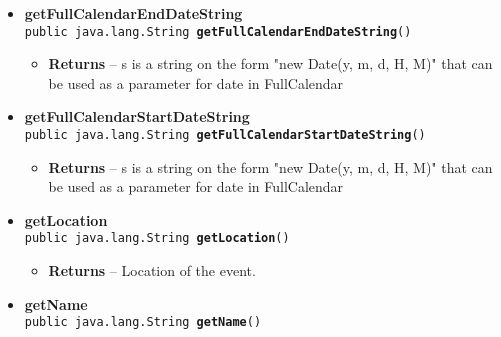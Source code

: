\documentclass[11pt,a4paper]{report}
\begin{document}
{{{\begin{itemize}
{
\hypertarget{is.mpg.ruglan.CalEvent.getEnd()}{{\bf  getEnd}\\}
\texttt{public java.util.Date\ {\bf  getEnd}()
\label{is.mpg.ruglan.CalEvent.getEnd()}}%
\begin{itemize}
\item{{\bf  Returns} -- 
End date of the event. 
}%
\end{itemize}
}%
\item{ 
\hypertarget{is.mpg.ruglan.CalEvent.getFullCalendarEndDateString()}{{\bf  getFullCalendarEndDateString}\\}
\texttt{public java.lang.String\ {\bf  getFullCalendarEndDateString}()
\label{is.mpg.ruglan.CalEvent.getFullCalendarEndDateString()}}%
\begin{itemize}
\item{{\bf  Returns} -- 
s is a string on the form "new Date(y, m, d, H, M)" that can be used as a parameter for date in FullCalendar 
}%
\end{itemize}
}%
\item{ 
\hypertarget{is.mpg.ruglan.CalEvent.getFullCalendarStartDateString()}{{\bf  getFullCalendarStartDateString}\\}
\texttt{public java.lang.String\ {\bf  getFullCalendarStartDateString}()
\label{is.mpg.ruglan.CalEvent.getFullCalendarStartDateString()}}%
\begin{itemize}
\item{{\bf  Returns} -- 
s is a string on the form "new Date(y, m, d, H, M)" that can be used as a parameter for date in FullCalendar 
}%
\end{itemize}
}%
\item{ 
\hypertarget{is.mpg.ruglan.CalEvent.getLocation()}{{\bf  getLocation}\\}
\texttt{public java.lang.String\ {\bf  getLocation}()
\label{is.mpg.ruglan.CalEvent.getLocation()}}%
\begin{itemize}
\item{{\bf  Returns} -- 
Location of the event. 
}%
\end{itemize}
}%
\item{ 
\hypertarget{is.mpg.ruglan.CalEvent.getName()}{{\bf  getName}\\}
\texttt{public java.lang.String\ {\bf  getName}()
\label{is.mpg.ruglan.CalEvent.getName()}}%
}
\end{itemize}}}}
\end{document}
